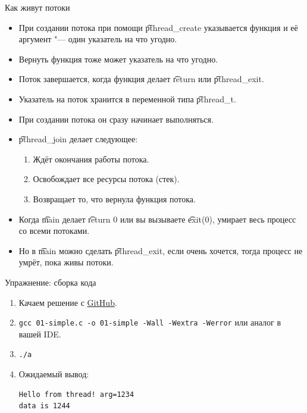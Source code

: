 \begin{frame}{Как живут потоки}
	\begin{itemize}
		\item При создании потока при помощи \t{pthread\_create} указывается функция и её аргумент "--- один указатель на что угодно.
		\item Вернуть функция тоже может указатель на что угодно.
		\item Поток завершается, когда функция делает \t{return} или \t{pthread\_exit}.
		\item Указатель на поток хранится в переменной типа \t{pthread\_t}.
		\item При создании потока он сразу начинает выполняться.
		\item \t{pthread\_join} делает следующее:
			\begin{enumerate}
				\item Ждёт окончания работы потока.
				\item Освобождает все ресурсы потока (стек).
				\item Возвращает то, что вернула функция потока.
			\end{enumerate}
		\item Когда \t{main} делает \t{return 0} или вы вызываете \t{exit(0)}, умирает весь процесс со всеми потоками.
		\item Но в \t{main} можно сделать \t{pthread\_exit}, если очень хочется, тогда процесс не умрёт, пока живы потоки.
	\end{itemize}
\end{frame}

\begin{frame}[fragile]{Упражнение: сборка кода}
	\begin{enumerate}
		\item Качаем решение с \href{https://github.com/yeputons/fall-2016-paradigms/raw/master/161019/sources/01-simple.c}{GitHub}.
		\item \texttt{gcc 01-simple.c -o 01-simple -Wall -Wextra -Werror} или аналог в вашей IDE.
		\item \texttt{./a}
		\item Ожидаемый вывод:
\begin{verbatim}
Hello from thread! arg=1234
data is 1244
\end{verbatim}
	\end{enumerate}
\end{frame}

